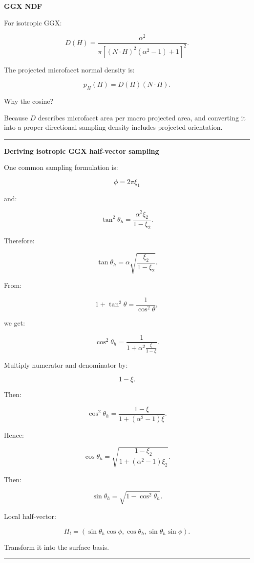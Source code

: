 \textbf{GGX NDF}

For isotropic GGX:

\[
D(H)
=
\frac{
\alpha^2
}{
\pi
[
(N\cdot H)^2(\alpha^2-1)+1
]^2
}.
\]

The projected microfacet normal density is:

\[
\boxed{
p_H(H)
=
D(H)(N\cdot H).
}
\]

Why the cosine?

Because \(D\) describes microfacet area per macro projected area, and converting it into a proper directional sampling density includes projected orientation.

\begin{center}\rule{0.5\linewidth}{0.5pt}\end{center}

\textbf{Deriving isotropic GGX half-vector sampling}

One common sampling formulation is:

\[
\phi=2\pi\xi_1
\]

and:

\[
\tan^2\theta_h
=
\frac{
\alpha^2\xi_2
}{
1-\xi_2
}.
\]

Therefore:

\[
\tan\theta_h
=
\alpha
\sqrt{
\frac{\xi_2}{1-\xi_2}
}.
\]

From:

\[
1+\tan^2\theta
=
\frac1{\cos^2\theta},
\]

we get:

\[
\cos^2\theta_h
=
\frac1{
1+
\alpha^2
\frac{\xi}{1-\xi}
}.
\]

Multiply numerator and denominator by:

\[
1-\xi.
\]

Then:

\[
\boxed{
\cos^2\theta_h
=
\frac{
1-\xi
}{
1+(\alpha^2-1)\xi
}.
}
\]

Hence:

\[
\boxed{
\cos\theta_h
=
\sqrt{
\frac{
1-\xi_2
}{
1+(\alpha^2-1)\xi_2
}
}.
}
\]

Then:

\[
\sin\theta_h
=
\sqrt{
1-\cos^2\theta_h
}.
\]

Local half-vector:

\[
H_l=
(
\sin\theta_h\cos\phi,
\cos\theta_h,
\sin\theta_h\sin\phi
).
\]

Transform it into the surface basis.

\begin{center}\rule{0.5\linewidth}{0.5pt}\end{center}

